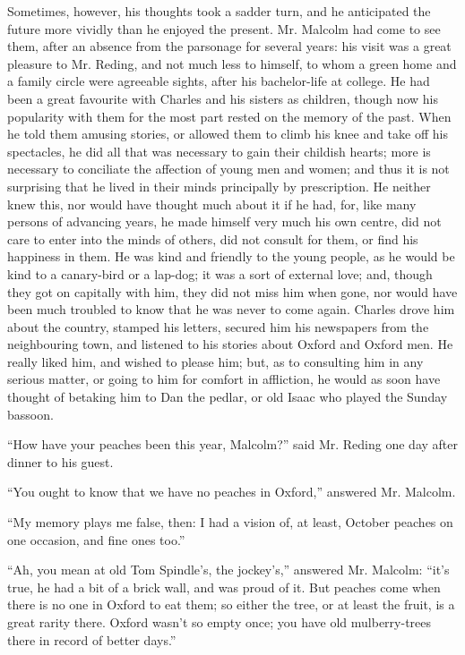 Sometimes, however, his thoughts took a sadder turn, and he
anticipated the future more vividly than he enjoyed the present. Mr.
Malcolm had come to see them, after an absence from the parsonage for
several years: his visit was a great pleasure to Mr. Reding, and not
much less to himself, to whom a green home and a family circle were
agreeable sights, after his bachelor-life at college. He had been a
great favourite with Charles and his sisters as children, though now
his popularity with them for the most part rested on the memory of the
past. When he told them amusing stories, or allowed them to climb his
knee and take off his spectacles, he did all that was necessary to
gain their childish hearts; more is necessary to conciliate the
affection of young men and women; and thus it is not surprising that
he lived in their minds principally by prescription. He neither knew
this, nor would have thought much about it if he had, for, like many
persons of advancing years, he made himself very much his own centre,
did not care to enter into the minds of others, did not consult for
them, or find his happiness in them. He was kind and friendly to the
young people, as he would be kind to a canary-bird or a lap-dog; it
was a sort of external love; and, though they got on capitally with
him, they did not miss him when gone, nor would have been much
troubled to know that he was never to come again. Charles drove him
about the country, stamped his letters, secured him his newspapers
from the neighbouring town, and listened to his stories about Oxford
and Oxford men. He really liked him, and wished to please him; but, as
to consulting him in any serious matter, or going to him for
comfort in affliction, he would as soon have thought of betaking him
to Dan the pedlar, or old Isaac who played the Sunday bassoon.

``How have your peaches been this year, Malcolm?'' said Mr.
Reding one day after dinner to his guest.

``You ought to know that we have no peaches in Oxford,''
answered Mr. Malcolm.

``My memory plays me false, then: I had a vision of, at least,
October peaches on one occasion, and fine ones too.''

``Ah, you mean at old Tom Spindle's, the jockey's,''
answered Mr. Malcolm: ``it's true, he had a bit of a brick wall,
and was proud of it. But peaches come when there is no one in Oxford
to eat them; so either the tree, or at least the fruit, is a great
rarity there. Oxford wasn't so empty once; you have old mulberry-trees
there in record of better days.''

